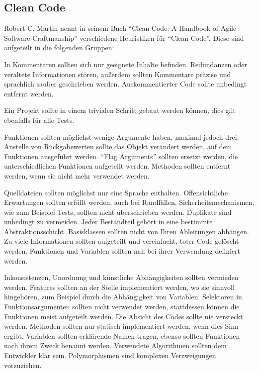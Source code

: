 \newpage

\subsection{Clean Code}
Robert C. Martin nennt in seinem Buch \enquote{Clean Code: A Handbook of Agile Software Craftmanship}\cite{clean-code} verschiedene Heuristiken für \enquote{Clean Code}.
Diese sind aufgeteilt in die folgenden Gruppen:

In Kommentaren sollten sich nur geeignete Inhalte befinden.
Redundanzen oder veraltete Informationen stören, außerdem sollten Kommentare präzise und sprachlich sauber geschrieben werden.
Auskommentierter Code sollte unbedingt entfernt werden.

Ein Projekt sollte in einem trivialen Schritt gebaut werden können, dies gilt ebenfalls für alle Tests.

Funktionen sollten möglichst wenige Argumente haben, maximal jedoch drei.
Anstelle von Rückgabewerten sollte das Objekt verändert werden, auf dem Funktionen ausgeführt werden.
\enquote{Flag Arguments} sollten ersetzt werden, die unterschiedlichen Funktionen aufgeteilt werden.
Methoden sollten entfernt werden, wenn sie nicht mehr verwendet werden.

Quelldateien sollten möglichst nur eine Sprache enthalten.
Offensichtliche Erwartungen sollten erfüllt werden, auch bei Randfällen.
Sicherheitsmechanismen, wie zum Beispiel Tests, sollten nicht überschrieben werden.
Duplikate sind unbedingt zu vermeiden.
Jeder Bestandteil gehört in eine bestimmte Abstraktionsschicht.
Basisklassen sollten nicht von Ihren Ableitungen abhängen.
Zu viele Informationen sollten aufgeteilt und vereinfacht, toter Code gelöscht werden.
Funktionen und Variablen sollten nah bei ihrer Verwendung definiert werden.

Inkonsistenzen, Unordnung und künstliche Abhängigkeiten sollten vermieden werden.
Features sollten an der Stelle implementiert werden, wo sie sinnvoll hingehören, zum Beispiel durch die Abhängigkeit von Variablen.
Selektoren in Funktionsargumenten sollten nicht verwendet werden, stattdessen können die Funktionen meist aufgeteilt werden.
Die Absicht des Codes sollte nie versteckt werden.
Methoden sollten nur statisch implementiert werden, wenn dies Sinn ergibt.
Variablen sollten erklärende Namen tragen, ebenso sollten Funktionen nach ihrem Zweck benannt werden.
Verwendete Algorithmen sollten dem Entwickler klar sein.
Polymorphismen sind komplexen Verzweigungen vorzuziehen.

